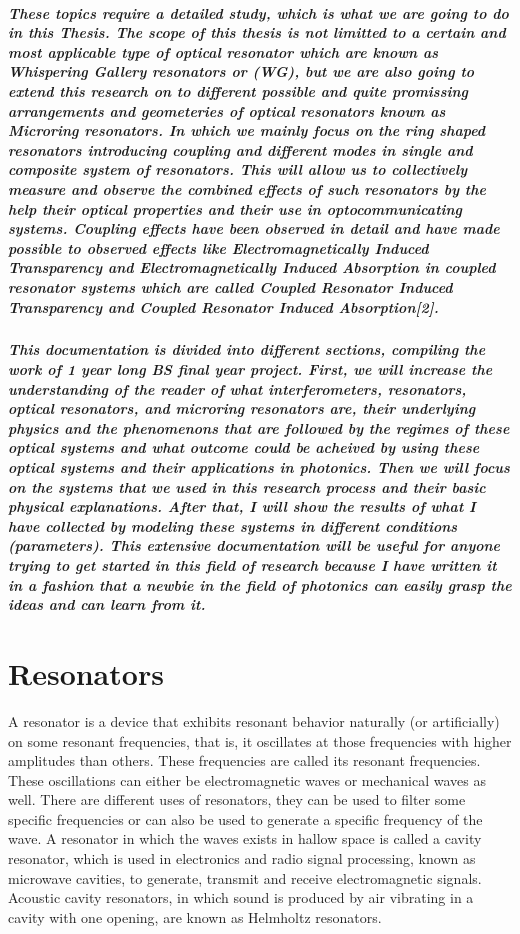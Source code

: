 \subparagraph{\normalfont \large These topics require a detailed study, which is what we are going to do in this Thesis. The scope of this thesis is not limitted to a certain and most applicable type of optical resonator which are known as Whispering Gallery resonators or (WG), but we are also going to extend this research on to different possible and quite promissing arrangements and geometeries of optical resonators known as Microring resonators. In which we mainly focus on the ring shaped resonators introducing coupling and different modes in single and composite system of resonators. This will allow us to collectively measure and observe the combined effects of such resonators by the help their optical properties and their use in optocommunicating systems. Coupling effects have been observed in detail and have made possible to observed effects like Electromagnetically Induced Transparency and Electromagnetically Induced Absorption in coupled resonator systems which are called Coupled Resonator Induced Transparency and Coupled Resonator Induced Absorption[2].}
\subparagraph{\normalfont \large This documentation is divided into different sections, compiling the work of 1 year long BS final year project. First, we will increase the understanding of the reader of what interferometers, resonators, optical resonators, and microring resonators are, their underlying physics and the phenomenons that are followed by the regimes of these optical systems and what outcome could be acheived by using these optical systems and their applications in photonics. Then we will focus on the systems that we used in this research process and their basic physical explanations. After that, I will show the results of what I have collected by modeling these systems in different conditions (parameters). This extensive documentation will be useful for anyone trying to get started in this field of research because I have written it in a fashion that a newbie in the field of photonics can easily grasp the ideas and can learn from it. }

\section{Resonators}
\normalfont \large A resonator is a device that exhibits resonant behavior naturally (or artificially) on some resonant frequencies, that is, it oscillates at those frequencies with higher amplitudes than others. These frequencies are called its resonant frequencies. These oscillations can either be electromagnetic waves or mechanical waves as well. 
There are different uses of resonators, they can be used to filter some specific frequencies or can also be used to generate a specific frequency of the wave. A resonator in which the waves exists in hallow space is called a cavity resonator, which is used in electronics and radio signal processing,  known as microwave cavities, to generate, transmit and receive electromagnetic signals.  Acoustic cavity resonators, in which sound is produced by air vibrating in a cavity with one opening, are known as Helmholtz resonators.

